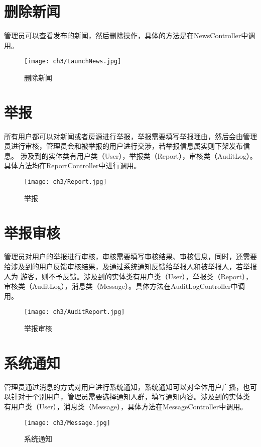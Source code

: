 \section{删除新闻}
管理员可以查看发布的新闻，然后删除操作，具体的方法是在NewsController中调用。
\begin{figure}[htbp]
    \centering
    \texttt{[image: ch3/LaunchNews.jpg]}
    \caption{删除新闻}\label{fig:DeleteNews}
    \vspace{\baselineskip} %
\end{figure}
\section{举报}
所有用户都可以对新闻或者房源进行举报，举报需要填写举报理由，然后会由管理员进行审核，管理员会和被举报的用户进行交涉，若举报信息属实则下架发布信息。
涉及到的实体类有用户类（User），举报类（Report），审核类（AuditLog）。具体方法均在ReportController中进行调用。
\begin{figure}[htbp]
    \centering
    \texttt{[image: ch3/Report.jpg]}
    \caption{举报}\label{fig:Report}
    \vspace{\baselineskip} %
\end{figure}
\section{举报审核}
管理员对用户的举报进行审核，审核需要填写审核结果、审核信息，同时，还需要给涉及到的用户反馈审核结果，及通过系统通知反馈给举报人和被举报人，若举报人为
游客，则不予反馈。涉及到的实体类有用户类（User），举报类（Report），审核类（AuditLog），消息类（Message）。具体方法在AuditLogController中调用。
\begin{figure}[htbp]
    \centering
    \texttt{[image: ch3/AuditReport.jpg]}
    \caption{举报审核}\label{fig:AuditReport}
    \vspace{\baselineskip} %
\end{figure}
\section{系统通知}
管理员通过消息的方式对用户进行系统通知，系统通知可以对全体用户广播，也可以针对于个别用户，管理员需要选择通知人群，填写通知内容。涉及到的实体类
有用户类（User），消息类（Message），具体方法在MessageController中调用。
\begin{figure}[htbp]
    \centering
    \texttt{[image: ch3/Message.jpg]}
    \caption{系统通知}\label{fig:Message}
    \vspace{\baselineskip} %
\end{figure}
